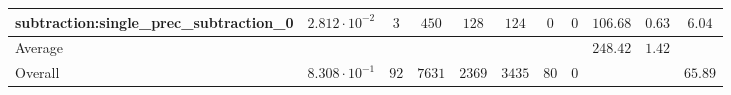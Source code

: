 \begin{tabular}{|l|c|c|c|c|c|c|c|c|c|c|}
subtraction:single\_prec\_subtraction\_0         & $ 2.812 \cdot 10^{-2} $ & $ 3      $ & $ 450  $ & $ 128  $ & $ 124   $ & $ 0  $ & $ 0 $ & $ 106.68      $ & $ 0.63    $ & $ 6.04    $ \\
\hline
Average                                          & $                     $ & $        $ & $      $ & $      $ & $       $ & $    $ & $   $ & $ 248.42      $ & $ 1.42    $ & $         $ \\
\hline
Overall                                          & $ 8.308 \cdot 10^{-1} $ & $ 92     $ & $ 7631 $ & $ 2369 $ & $ 3435  $ & $ 80 $ & $ 0 $ & $             $ & $         $ & $ 65.89   $ \\
\hline
\end{tabular}
